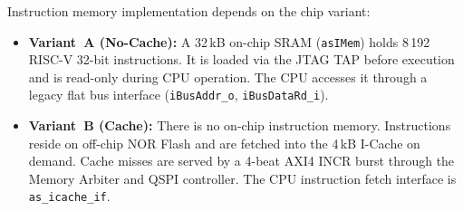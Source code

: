 Instruction memory implementation depends on the chip variant:

\begin{itemize}
  \item \textbf{Variant~A (No-Cache):}
    A 32\,kB on-chip SRAM (\texttt{asIMem}) holds 8\,192 RISC-V 32-bit
    instructions.
    It is loaded via the JTAG TAP before execution and is read-only
    during CPU operation.
    The CPU accesses it through a legacy flat bus interface
    (\texttt{iBusAddr\_o}, \texttt{iBusDataRd\_i}).

  \item \textbf{Variant~B (Cache):}
    There is no on-chip instruction memory.
    Instructions reside on off-chip NOR Flash and are fetched into the
    4\,kB I-Cache on demand.
    Cache misses are served by a 4-beat AXI4 INCR burst through the Memory
    Arbiter and QSPI controller.
    The CPU instruction fetch interface is \texttt{as\_icache\_if}.
\end{itemize}
